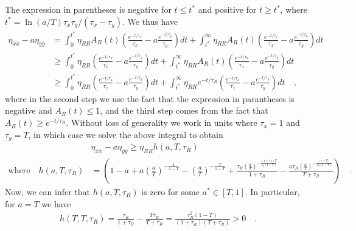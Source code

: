 \documentclass[%
 reprint,
superscriptaddress,
%
%
%
%
%
%
%
%
%
 amsmath,amssymb,
 aps,
%
%
%
%
%
%
onecolumn]{revtex4-2}
\begin{document}
The expression in parentheses is negative for $t \leq t^{*}$ and positive for $t \geq t^{*}$, where $t^{*} = \ln(a/T)\tau_{x}\tau_{y}/(\tau_{x} - \tau_{y})$. We thus have 
\begin{align}
 \eta_{\bar{x}\bar{x}} - a \eta_{\bar{y}\bar{y}} &= 
 \int_{0}^{t^{*}} \eta_{RR}A_{R}(t) \left( \frac{e^{-t/\tau_{x}}}{\tau_{x}} - a \frac{e^{-t/\tau_{y}}}{\tau_{y}}\right)  dt  + \int_{t^{*}}^{\infty} \eta_{RR}A_{R}(t) \left( \frac{e^{-t/\tau_{x}}}{\tau_{x}} - a \frac{e^{-t/\tau_{y}}}{\tau_{y}}\right)  dt \nonumber\\
 &\geq \int_{0}^{t^{*}} \eta_{RR} \left( \frac{e^{-t/\tau_{x}}}{\tau_{x}} - a \frac{e^{-t/\tau_{y}}}{\tau_{y}}\right)  dt  +  \int_{t^{*}}^{\infty} \eta_{RR}A_{R}(t) \left( \frac{e^{-t/\tau_{x}}}{\tau_{x}} - a \frac{e^{-t/\tau_{y}}}{\tau_{y}}\right)  dt \nonumber\\
 &\geq \int_{0}^{t^{*}} \eta_{RR} \left( \frac{e^{-t/\tau_{x}}}{\tau_{x}} - a \frac{e^{-t/\tau_{y}}}{\tau_{y}}\right)  dt  +  \int_{t^{*}}^{\infty} \eta_{RR}e^{-t/\tau_{R}} \left( \frac{e^{-t/\tau_{x}}}{\tau_{x}} - a \frac{e^{-t/\tau_{y}}}{\tau_{y}}\right)  dt \quad , \label{EQ: integral}
\end{align}
where in the second step we use the fact that the expression in parantheses is negative and $A_{R}(t) \leq 1$, and the third step comes from the fact that $A_{R}(t) \geq e^{-t/\tau_{R}}$. 
Without loss of generality we work in units where $\tau_{x} = 1$ and $\tau_{y} = T$, in which case we solve the above integral to obtain 
\begin{align}
  &\eta_{\bar{x}\bar{x}} - a \eta_{\bar{y}\bar{y}} \geq \eta_{RR} h(a,T,\tau_{R}) \\
  \text{where} \quad h(a,T,\tau_{R}) &= \left(1 - a  +   a\left(\frac{a}{T}\right)^{-\frac{1}{1 - T}} - \left(\frac{a}{T}\right)^{-\frac{T}{1 - T}} +  \frac{\tau_{R}\left(\frac{a}{T}\right)^{-\frac{(1+\tau_{R})T}{\tau_{R}(1-T)}}}{1+\tau_{R}} - \frac{a\tau_{R}\left(\frac{a}{T}\right)^{-\frac{(r+T)}{\tau_{R}(1-T)}}}{T+\tau_{R}} \right) \quad .\nonumber
\label{EQ: no-oscillation 1-step timescale a equation}
\end{align}
Now, we can infer that $h(a, T, \tau_{R})$ is zero for some $a^{*} \in [T,1]$. In particular, for $a = T$ we have
\begin{align*}
    h(T,T,\tau_{R}) = \frac{\tau_{R}}{1+\tau_{R}} - \frac{T\tau_{R}}{T + \tau_{R}} = \frac{\tau_{R}^{2}(1  - T)}{(1+\tau_{R})(T + \tau_{R})} > 0 \quad .
\end{align*}
\end{document}
